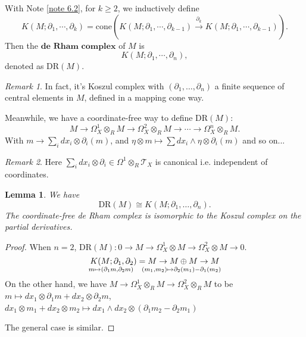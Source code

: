 \documentclass[openany]{book}
\newtheorem{lemma}[theorem]{Lemma}     %
\theoremstyle{definition} %
\theoremstyle{remark}
\newtheorem{remark}{Remark}[chapter] %
\begin{document}
With Note \ref{note 6.2}, for $k \geq 2$, we inductively define     $$K(M; \partial_1, \cdots, \partial_k) = \text{cone}\left(K(M; \partial_1, \cdots, \partial_{k-1}) \xrightarrow{\partial_k} K(M; \partial_1, \cdots, \partial_{k-1})\right).$$ Then the $\textbf{de Rham complex}$ of $M$ is   $$K(M; \partial_1, \cdots, \partial_n),$$ denoted as $\mathrm{DR}(M).$

\begin{remark}
    In fact, it's Koszul complex with $(\partial_{1},\dots,\partial_{n})$ a finite sequence of central elements in $M$, defined in a mapping cone way.
\end{remark}

Meanwhile, we have a coordinate-free way to define $\mathrm{DR}(M)$: $$M \to \Omega^{1}_{X} \otimes_{R} M \to \Omega^{2}_{X} \otimes_{R} M \to \cdots \to \Omega^{n}_{X} \otimes_{R} M.$$With $m\rightarrow \sum\limits_{i}dx_{i}\otimes \partial_{i}(m)$, and $\eta \otimes m \mapsto \sum dx_i \wedge \eta \otimes \partial_i(m)$ and so on...

\begin{remark}
    Here $\sum\limits_{i} dx_i \otimes \partial_i \in \Omega^1 \otimes_R \mathcal{T}_X$ is canonical i.e. independent of coordinates.
\end{remark}

\begin{lemma}
    We have $$\mathrm{DR}(M) \cong K(M; \partial_1, \ldots, \partial_n).$$The coordinate-free de Rham complex is isomorphic to the Koszul complex on the partial derivatives.
\end{lemma}
\begin{proof}
    When $n = 2$,  $\mathrm{DR}(M):0 \to M \to \Omega^{1}_{X} \otimes M \to \Omega^{2}_{X} \otimes M \to 0.$ $$K(M; \partial_{1}, \partial_{2})= M \to M \oplus M \to M\atop m \mapsto (\partial_{1} m, \partial_{2} m)\quad(m_1, m_2) \mapsto \partial_2(m_1) - \partial_1(m_2)$$On the other hand, we have $M\rightarrow \Omega^{1}_{X}\otimes_{R} M\rightarrow \Omega_{X}^{2}\otimes_{R}M$ to be $m\mapsto dx_{1}\otimes\partial_{1} m+dx_{2}\otimes\partial_{2}m$, $dx_{1}\otimes m_{1}+dx_{2}\otimes m_{2}\mapsto dx_{1}\wedge dx_{2}\otimes(\partial_{1} m_{2}-\partial_{2} m_{1})$

    The general case is similar.
\end{proof}
\end{document}

